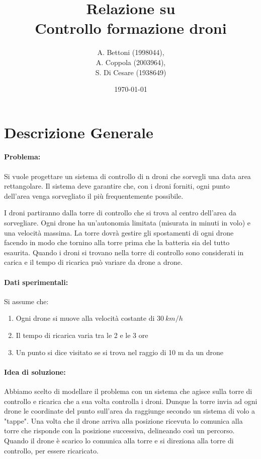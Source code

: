 \documentclass[a4paper, 11pt]{article}
\title{Relazione su \\
Controllo formazione droni}
\author{A. Bettoni (1998044),\\ A. Coppola (2003964),\\S. Di Cesare (1938649)}
\date{\today}
\begin{document}
\maketitle
\newpage
\tableofcontents
\newpage
\section{Descrizione Generale}
\paragraph*{Problema:}
Si vuole progettare un sistema di controllo di n droni che sorvegli una data area rettangolare.
Il sistema deve garantire che, con i droni forniti, ogni punto dell'area venga sorvegliato il più frequentemente possibile.

I droni partiranno dalla torre di controllo che si trova al centro dell'area da sorvegliare.
Ogni drone ha un'autonomia limitata (misurata in minuti in volo) e una velocità massima. 
La torre dovrà gestire gli spostamenti di ogni drone facendo in modo che tornino alla torre prima che la batteria sia del tutto esaurita. 
Quando i droni si trovano nella torre di controllo sono considerati in carica e il tempo di ricarica può variare da drone a drone.

\paragraph*{Dati sperimentali:}
Si assume che:
\begin{enumerate}
    \item Ogni drone si muove alla velocità costante di $30\ km/h$
    \item Il tempo di ricarica varia tra le 2 e le 3 ore 
    \item Un punto si dice visitato se si trova nel raggio di 10 m da un drone
\end{enumerate}
\paragraph*{Idea di soluzione:}
Abbiamo scelto di modellare il problema con un sistema che agisce sulla torre di controllo e ricarica che a sua volta controlla i droni.
Dunque la torre invia ad ogni drone le coordinate del punto sull'area da raggiunge secondo un sistema di volo a "tappe".
Una volta che il drone arriva alla posizione ricevuta lo comunica alla torre che risponde con la posizione successiva, delineando così un percorso.
Quando il drone è scarico lo comunica alla torre e si direziona alla torre di controllo, per essere ricaricato.
\end{document}
